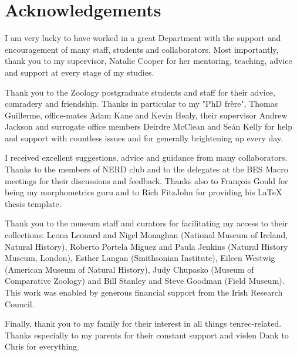 
\chapter*{Acknowledgements}

I am very lucky to have worked in a great Department with the support and encouragement of many staff, students and collaborators. Most importantly, thank you to my supervisor, Natalie Cooper for her mentoring, teaching, advice and support at every stage of my studies. 

Thank you to the Zoology postgraduate students and staff for their advice, comradery and friendship. Thanks in particular to my "PhD fr\`{e}re", Thomas Guillerme, office-mates Adam Kane and Kevin Healy, their supervisor Andrew Jackson and surrogate office members Deirdre McClean and Se\'{a}n Kelly for help and support with countless issues and for generally brightening up every day.

I received excellent suggestions, advice and guidance from many collaborators. Thanks to the members of NERD club and to the delegates at the BES Macro meetings for their discussions and feedback. Thanks also to Fran\c{c}ois Gould for being my morphometrics guru and to Rich FitzJohn for providing his LaTeX thesis template. 

Thank you to the museum staff and curators for facilitating my access to their collections: Leona Leonard and Nigel Monaghan (National Museum of Ireland, Natural History), Roberto Portela Miguez and Paula Jenkins (Natural History Museum, London), Esther Langan (Smithsonian Institute), Eileen Westwig (American Museum of Natural History), Judy Chupasko (Museum of Comparative Zoology) and Bill Stanley and Steve Goodman (Field Museum). This work was enabled by generous financial support from the Irish Research Council.

Finally, thank you to my family for their interest in all things tenrec-related. Thanks especially to my parents for their constant support and vielen Dank to Chris for everything. 